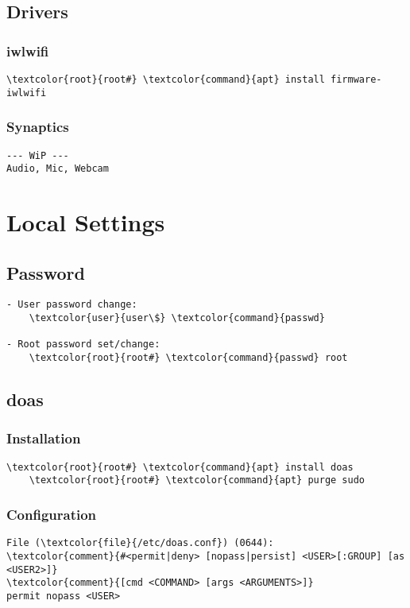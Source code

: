 \documentclass[10pt, a4paper, onecolumn, openany]{book} %
\begin{document}
\section{Drivers}
\subsection{iwlwifi}
\begin{Verbatim}[commandchars=\\\{\}]
    \textcolor{root}{root#} \textcolor{command}{apt} install firmware-iwlwifi
\end{Verbatim}
\subsection{Synaptics}
\begin{Verbatim}[commandchars=\\\{\}]
--- WiP ---
Audio, Mic, Webcam
\end{Verbatim}



\chapter{Local Settings}
\section{Password}
\begin{Verbatim}[commandchars=\\\{\}]
- User password change:
    \textcolor{user}{user\$} \textcolor{command}{passwd}
   
- Root password set/change: 
    \textcolor{root}{root#} \textcolor{command}{passwd} root
\end{Verbatim}

\section{doas}
\subsection{Installation}
\begin{Verbatim}[commandchars=\\\{\}]
    \textcolor{root}{root#} \textcolor{command}{apt} install doas
    \textcolor{root}{root#} \textcolor{command}{apt} purge sudo
\end{Verbatim}
\subsection{Configuration}
\begin{Verbatim}[commandchars=\\\{\}]
File (\textcolor{file}{/etc/doas.conf}) (0644):
\textcolor{comment}{#<permit|deny> [nopass|persist] <USER>[:GROUP] [as <USER2>]}
\textcolor{comment}{[cmd <COMMAND> [args <ARGUMENTS>]}
permit nopass <USER>
\end{Verbatim}
\end{document}
